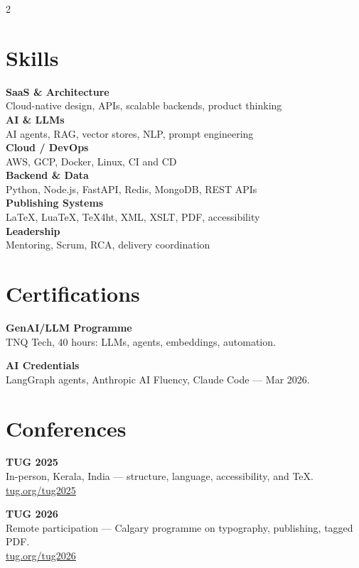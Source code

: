 \documentclass[10pt]{article}
\begin{document}
\setlength{\columnsep}{0.65cm}
\begin{paracol}{2}

\section*{Skills}
\textbf{SaaS \& Architecture}\\
Cloud-native design, APIs, scalable backends, product thinking\\[-8pt]

\textbf{AI \& LLMs}\\
AI agents, RAG, vector stores, NLP, prompt engineering\\[-8pt]

\textbf{Cloud / DevOps}\\
AWS, GCP, Docker, Linux, CI and CD\\[-8pt]

\textbf{Backend \& Data}\\
Python, Node.js, FastAPI, Redis, MongoDB, REST APIs\\[-8pt]

\textbf{Publishing Systems}\\
LaTeX, LuaTeX, TeX4ht, XML, XSLT, PDF, accessibility\\[-8pt]

\textbf{Leadership}\\
Mentoring, Scrum, RCA, delivery coordination

\section*{Certifications}
\textbf{GenAI/LLM Programme}\\
TNQ Tech, 40 hours: LLMs, agents, embeddings, automation.

\textbf{AI Credentials}\\
LangGraph agents, Anthropic AI Fluency, Claude Code — Mar 2026.

\section*{Conferences}
\textbf{TUG 2025}\\
In-person, Kerala, India — structure, language, accessibility, and TeX.\\
\href{https://tug.org/tug2025}{tug.org/tug2025}

\textbf{TUG 2026}\\
Remote participation — Calgary programme on typography, publishing, tagged PDF.\\
\href{https://tug.org/tug2026}{tug.org/tug2026}


\end{paracol}
\end{document}
